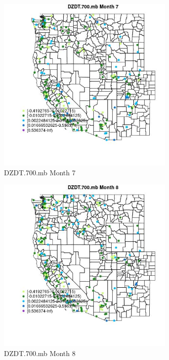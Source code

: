 \begin{figure} 
\centering  
\includegraphics[width=0.77\textwidth]{Code_Outputs/Report_ML_input_PM25_Step4_part_e_de_duplicated_aveswNAs_MapObsMo7DZDT700mb.jpg} 
\caption{\label{fig:Report_ML_input_PM25_Step4_part_e_de_duplicated_aveswNAsMapObsMo7DZDT700mb}DZDT.700.mb Month 7} 
\end{figure} 
 

\begin{figure} 
\centering  
\includegraphics[width=0.77\textwidth]{Code_Outputs/Report_ML_input_PM25_Step4_part_e_de_duplicated_aveswNAs_MapObsMo8DZDT700mb.jpg} 
\caption{\label{fig:Report_ML_input_PM25_Step4_part_e_de_duplicated_aveswNAsMapObsMo8DZDT700mb}DZDT.700.mb Month 8} 
\end{figure} 
 

